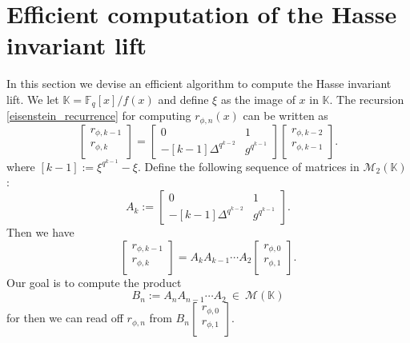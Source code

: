 \documentclass[12pt]{article}
\theoremstyle{plain}
\theoremstyle{definition}
\def\F{\ensuremath{\mathbb{F}}}
\def\K{\ensuremath{\mathbb{K}}}
\begin{document}
\section{Efficient computation of the Hasse invariant lift}
\label{sec:hasse}

In this section we devise an efficient algorithm to compute the Hasse invariant lift. We let $\K = 
\F_q[x]/f(x)$ and define $\xi$ as the image of $x$ in $\K$. The recursion  
\ref{eisenstein_recurrence} for computing $r_{\phi,n}(x)$ can be written as
\[
\begin{bmatrix}
r_{\phi,k - 1} \\
r_{\phi,k} \\
\end{bmatrix} = 
\begin{bmatrix}
0 & 1 \\
-[k - 1]\Delta^{q^{k - 2}} & g^{q^{k - 1}}
\end{bmatrix}
\begin{bmatrix}
r_{\phi,k - 2} \\
r_{\phi,k - 1} \\
\end{bmatrix}.
\]
where $[k - 1]:=\xi^{q^{k - 1}}-\xi$. Define the following sequence of matrices in 
$\mathscr{M}_2(\K)$:
\[
A_k :=\begin{bmatrix}
0 & 1 \\
-[k - 1]\Delta^{q^{k - 2}} & g^{q^{k - 1}}
\end{bmatrix}.
\]
Then we have
\[
\begin{bmatrix}
r_{\phi,k - 1} \\
r_{\phi,k} \\
\end{bmatrix} = 
A_kA_{k - 1} \cdots A_2
\begin{bmatrix}
r_{\phi,0} \\
r_{\phi,1} \\
\end{bmatrix}.
\]
Our goal is to compute the product 
\[B_n := A_nA_{n - 1} \cdots A_2 ~ \in ~ \mathscr{M}(\K)\]
for then we can read off $r_{\phi,n}$ from $B_n\begin{bmatrix}
r_{\phi,0} \\
r_{\phi,1} \\
\end{bmatrix}.$ 
\end{document}
